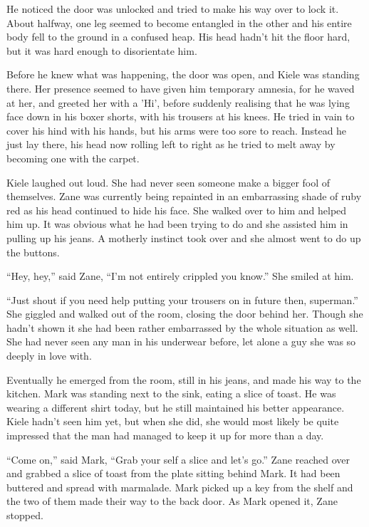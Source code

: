 He noticed the door was unlocked and tried to make his way over to lock it.  About halfway, one leg seemed to become entangled in the other and his entire body fell to the ground in a confused heap.  His head hadn't hit the floor hard, but it was hard enough to disorientate him.

Before he knew what was happening, the door was open, and Kiele was standing there.  Her presence seemed to have given him temporary amnesia, for he waved at her, and greeted her with a 'Hi', before suddenly realising that he was lying face down in his boxer shorts, with his trousers at his knees.  He tried in vain to cover his hind with his hands, but his arms were too sore to reach.  Instead he just lay there, his head now rolling left to right as he tried to melt away by becoming one with the carpet.  

Kiele laughed out loud.  She had never seen someone make a bigger fool of themselves.  Zane was currently being repainted in an embarrassing shade of ruby red as his head continued to hide his face.  She walked over to him and helped him up.  It was obvious what he had been trying to do and she assisted him in pulling up his jeans.  A motherly instinct took over and she almost went to do up the buttons.

``Hey, hey,'' said Zane, ``I'm not entirely crippled you know.''  She smiled at him.

``Just shout if you need help putting your trousers on in future then, superman.''  She giggled and walked out of the room, closing the door behind her.  Though she hadn't shown it she had been rather embarrassed by the whole situation as well.  She had never seen any man in his underwear before, let alone a guy she was so deeply in love with.

Eventually he emerged from the room, still in his jeans, and made his way to the kitchen.  Mark was standing next to the sink, eating a slice of toast.  He was wearing a different shirt today, but he still maintained his better appearance.  Kiele hadn't seen him yet, but when she did, she would most likely be quite impressed that the man had managed to keep it up for more than a day.

``Come on,'' said Mark, ``Grab your self a slice and let's go.''  Zane reached over and grabbed a slice of toast from the plate sitting behind Mark.  It had been buttered and spread with marmalade.  Mark picked up a key from the shelf and the two of them made their way to the back door.  As Mark opened it, Zane stopped.  

